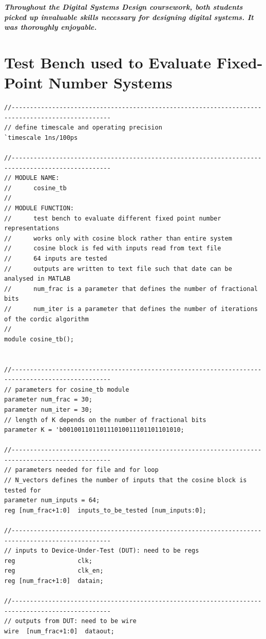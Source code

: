 \documentclass{article}
\begin{document}
\textbf{\textit{Throughout the Digital Systems Design coursework, both students picked up invaluable skills necessary for designing digital systems. It was thoroughly enjoyable.}}

\newpage
\appendix
\section{Test Bench used to Evaluate Fixed-Point Number Systems}\label{app:test_bench}
\begin{verbatim}
//-------------------------------------------------------------------------------------------------
// define timescale and operating precision
`timescale 1ns/100ps

//-------------------------------------------------------------------------------------------------
// MODULE NAME: 
//      cosine_tb
//
// MODULE FUNCTION:
//      test bench to evaluate different fixed point number representations
//      works only with cosine block rather than entire system
//      cosine block is fed with inputs read from text file
//      64 inputs are tested
//      outputs are written to text file such that date can be analysed in MATLAB
//      num_frac is a parameter that defines the number of fractional bits
//      num_iter is a parameter that defines the number of iterations of the cordic algorithm
//      
module cosine_tb();


//-------------------------------------------------------------------------------------------------
// parameters for cosine_tb module
parameter num_frac = 30;
parameter num_iter = 30;
// length of K depends on the number of fractional bits
parameter K = 'b00100110110111010011101101101010;

//-------------------------------------------------------------------------------------------------
// parameters needed for file and for loop
// N_vectors defines the number of inputs that the cosine block is tested for
parameter num_inputs = 64;
reg [num_frac+1:0]  inputs_to_be_tested [num_inputs:0];

//-------------------------------------------------------------------------------------------------
// inputs to Device-Under-Test (DUT): need to be regs  
reg                 clk;
reg                 clk_en;
reg [num_frac+1:0]  datain;

//-------------------------------------------------------------------------------------------------
// outputs from DUT: need to be wire
wire  [num_frac+1:0]  dataout;


\end{verbatim}
\end{document}
